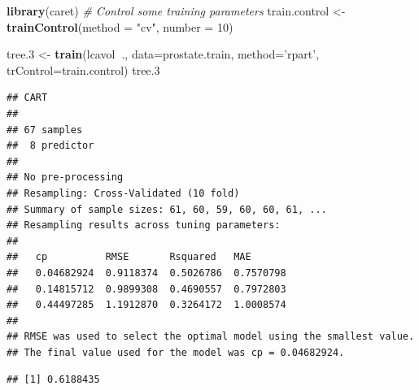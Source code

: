 \documentclass[]{book}
\newenvironment{Shaded}{\begin{snugshade}}{\end{snugshade}}
\newcommand{\KeywordTok}[1]{\textcolor[rgb]{0.13,0.29,0.53}{\textbf{#1}}}
\newcommand{\DataTypeTok}[1]{\textcolor[rgb]{0.13,0.29,0.53}{#1}}
\newcommand{\DecValTok}[1]{\textcolor[rgb]{0.00,0.00,0.81}{#1}}
\newcommand{\StringTok}[1]{\textcolor[rgb]{0.31,0.60,0.02}{#1}}
\newcommand{\CommentTok}[1]{\textcolor[rgb]{0.56,0.35,0.01}{\textit{#1}}}
\newcommand{\OperatorTok}[1]{\textcolor[rgb]{0.81,0.36,0.00}{\textbf{#1}}}
\newcommand{\NormalTok}[1]{#1}
\theoremstyle{definition}
\theoremstyle{definition}
\theoremstyle{definition}
\theoremstyle{remark}
\begin{document}
\begin{Shaded}
\begin{Highlighting}[]
\KeywordTok{library}\NormalTok{(caret)}
\CommentTok{# Control some training parameters}
\NormalTok{train.control <-}\StringTok{ }\KeywordTok{trainControl}\NormalTok{(}\DataTypeTok{method =} \StringTok{"cv"}\NormalTok{,}
                           \DataTypeTok{number =} \DecValTok{10}\NormalTok{)}

\NormalTok{tree.}\DecValTok{3}\NormalTok{ <-}\StringTok{ }\KeywordTok{train}\NormalTok{(lcavol}\OperatorTok{~}\NormalTok{., }\DataTypeTok{data=}\NormalTok{prostate.train, }
                \DataTypeTok{method=}\StringTok{'rpart'}\NormalTok{, }
                \DataTypeTok{trControl=}\NormalTok{train.control)}
\NormalTok{tree.}\DecValTok{3}
\end{Highlighting}
\end{Shaded}

\begin{verbatim}
## CART 
## 
## 67 samples
##  8 predictor
## 
## No pre-processing
## Resampling: Cross-Validated (10 fold) 
## Summary of sample sizes: 61, 60, 59, 60, 60, 61, ... 
## Resampling results across tuning parameters:
## 
##   cp          RMSE       Rsquared   MAE      
##   0.04682924  0.9118374  0.5026786  0.7570798
##   0.14815712  0.9899308  0.4690557  0.7972803
##   0.44497285  1.1912870  0.3264172  1.0008574
## 
## RMSE was used to select the optimal model using the smallest value.
## The final value used for the model was cp = 0.04682924.
\end{verbatim}

\begin{Shaded}
\end{Shaded}

\begin{verbatim}
## [1] 0.6188435
\end{verbatim}

\begin{Shaded}
\end{Shaded}
\end{document}
